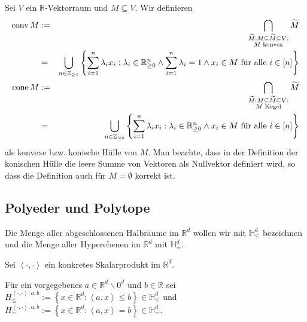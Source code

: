 \documentclass[10p,a4paper,BCOR = 12mm, DIV=15]{scrbook}
\begin{document}
\begin{Def}
Sei $V$ ein $\mathbb{R}$-Vektorraum und $M \subseteq V$. Wir definieren
\begin{eqnarray*}
\operatorname{conv} M & := & \bigcap_{\substack{
\widetilde{M}: M \subseteq \widetilde{M} \subseteq V: \\
M\textnormal{ konvex}}} \widetilde{M} \\
& = & \bigcup_{n \in \mathbb{Z}_{\geq 1}} \left\{\sum_{i=1}^n \lambda_i x_i: \lambda_i \in \mathbb{R}_{\geq 0}^n \wedge \sum_{i=1}^n \lambda_i = 1 \wedge x_i\in M\textnormal{ für alle }i \in \left[n\right] \right\} \\
\operatorname{cone} M & := & \bigcap_{\substack{
\widetilde{M}: M \subseteq \widetilde{M} \subseteq V: \\
M\textnormal{ Kegel}}} \widetilde{M} \\
& = & \bigcup_{n \in \mathbb{Z}_{\geq 0}} \left\{\sum_{i=1}^n \lambda_i x_i: \lambda_i \in \mathbb{R}_{\geq 0}^n \wedge x_i\in M\textnormal{ für alle }i \in \left[n\right] \right\}
\end{eqnarray*}
als 
konvexe bzw. konische Hülle von $M$. Man beachte, dass in der Definition der konischen Hülle die leere Summe von Vektoren als Nullvektor definiert wird, so dass die Definition auch für $M=\emptyset$ korrekt ist.
\end{Def}

\subsection{Polyeder und Polytope}

\begin{Def}
Die Menge aller abgeschlossenen Halbräume im $\mathbb{R}^d$ wollen wir mit $\mathbb{H}_{\leq}^d$ bezeichnen und die Menge aller Hyperebenen im $\mathbb{R}^d$ mit $\mathbb{H}_=^d$.

Sei $\left\langle\cdot, \cdot\right\rangle$ ein konkretes Skalarprodukt im $\mathbb{R}^d$.

Für ein vorgegebenes $a \in \mathbb{R}^d \backslash 0^d$ und $b \in \mathbb{R}$ sei $H_{\leq}^{\left\langle\cdot, \cdot\right\rangle, a, b} := \left\{x \in \mathbb{R}^d: \left\langle a, x\right\rangle \leq b\right\} \in \mathbb{H}_{\leq}^d$ und $H_=^{\left\langle\cdot, \cdot\right\rangle, a, b} := \left\{x \in \mathbb{R}^d: \left\langle a, x\right\rangle = b\right\} \in \mathbb{H}_=^d$.
\end{Def}
\end{document}
